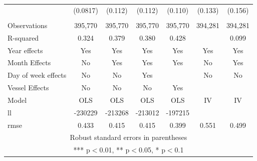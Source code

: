 \begin{tabular}{lcccccc}
 & (0.0817) & (0.112) & (0.112) & (0.110) & (0.133) & (0.156) \\
 &  &  &  &  &  &  \\
Observations & 395,770 & 395,770 & 395,770 & 395,770 & 394,281 & 394,281 \\
R-squared & 0.324 & 0.379 & 0.380 & 0.428 &  & 0.099 \\
Year effects & Yes & Yes & Yes & Yes & Yes & Yes \\
Month Effects & No & Yes & Yes & Yes & No & Yes \\
Day of week effects & No & No & Yes &  & No & No \\
Vessel Effects & No & No & No & Yes &  &  \\
Model & OLS & OLS & OLS & OLS & IV & IV \\
ll & -230229 & -213268 & -213012 & -197215 &  &  \\
 rmse & 0.433 & 0.415 & 0.415 & 0.399 & 0.551 & 0.499 \\ \hline
\multicolumn{7}{c}{ Robust standard errors in parentheses} \\
\multicolumn{7}{c}{ *** p$<$0.01, ** p$<$0.05, * p$<$0.1} \\
\end{tabular}
